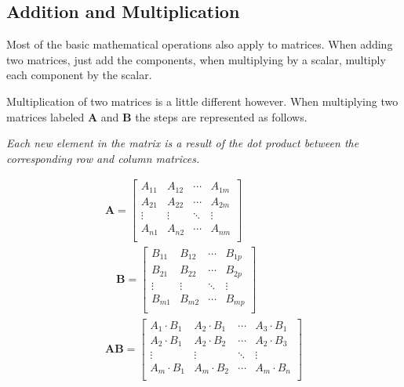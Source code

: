 \documentclass[12pt, landscape, twocolumn]{article}
\begin{document}
    \subsection{Addition and Multiplication}
    Most of the basic mathematical operations also apply to matrices. When adding two matrices, just add the components, when multiplying by a scalar, multiply each component by the scalar.

    Multiplication of two matrices is a little different however. When multiplying two matrices labeled $\mathbf{A}$ and $\mathbf{B}$ the steps are represented as follows.

    \begin{center}
        \textit{Each new element in the matrix is a result of the dot product between the corresponding row and column matrices.}
    \end{center}
    \begin{equation}\label{eq:matrixmultiplication}
    \begin{aligned}
        \mathbf{A}=
        \left[\begin{matrix}
        A_{11} & A_{12} & \cdots & A_{1m} \\
        A_{21} & A_{22} & \cdots & A_{2m} \\
        \vdots & \vdots & \ddots & \vdots \\
        A_{n1} & A_{n2} & \cdots & A_{nm} \\
        \end{matrix}\right]\\
        \quad\mathbf{B}=
        \left[\begin{matrix}
        B_{11} & B_{12} & \cdots & B_{1p} \\
        B_{21} & B_{22} & \cdots & B_{2p} \\
        \vdots & \vdots & \ddots & \vdots \\
        B_{m1} & B_{m2} & \cdots & B_{mp} \\
        \end{matrix}\right]\\
        \mathbf{A}\mathbf{B}=
        \left[\begin{matrix}
        A_1 \cdot B_1 & A_2 \cdot B_1 & \cdots & A_3 \cdot B_1 \\
        A_2 \cdot B_1 & A_2 \cdot B_2 & \cdots & A_2 \cdot B_3 \\
        \vdots & \vdots & \ddots & \vdots \\
        A_m \cdot B_1 & A_m \cdot B_2 & \cdots & A_m \cdot B_n \\
        \end{matrix}\right]
    \end{aligned}
    \end{equation}
\end{document}
